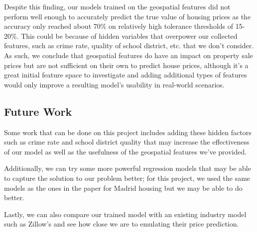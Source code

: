 \documentclass[11pt,a4paper]{article}
\begin{document}
\medskip

Despite this finding, our models trained on the geospatial features did not perform well enough to accurately predict the true value of housing prices as the accuracy only reached about 70\% on relatively high tolerance thresholds of 15-20\%. This could be because of hidden variables that overpower our collected features, such as crime rate, quality of school district, etc. that we don’t consider. As such, we conclude that geospatial features do have an impact on property sale prices but are not sufficient on their own to predict house prices, although it’s a great initial feature space to investigate and adding additional types of features would only improve a resulting model’s usability in real-world scenarios.

\subsection{Future Work}

Some work that can be done on this project includes adding these hidden factors such as crime rate and school district quality that may increase the effectiveness of our model as well as the usefulness of the geospatial features we've provided.

\medskip

Additionally, we can try some more powerful regression models that may be able to capture the solution to our problem better; for this project, we used the same models as the ones in the paper for Madrid housing \cite{bergadano2019learning} but we may be able to do better.

\medskip

Lastly, we can also compare our trained model with an existing industry model such as Zillow's and see how close we are to emulating their price prediction.



\end{document}
